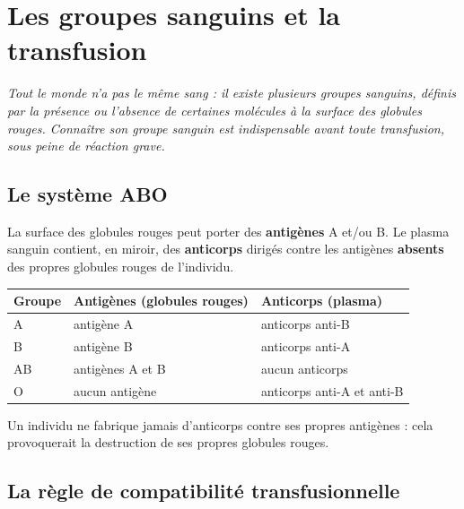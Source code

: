 \chapter{Les groupes sanguins et la transfusion}

\noindent\textit{Tout le monde n'a pas le même sang : il existe plusieurs groupes
sanguins, définis par la présence ou l'absence de certaines molécules à la surface des
globules rouges. Connaître son groupe sanguin est indispensable avant toute transfusion,
sous peine de réaction grave.}
\vspace{8pt}

\connecteBanner

\section{Le système ABO}

\begin{definition}
La surface des globules rouges peut porter des \textbf{antigènes} A et/ou B. Le plasma
sanguin contient, en miroir, des \textbf{anticorps} dirigés contre les antigènes
\textbf{absents} des propres globules rouges de l'individu.
\end{definition}

\begin{propriete}
\begin{center}
\small
\begin{tabular}{lll}
\toprule
\textbf{Groupe} & \textbf{Antigènes (globules rouges)} & \textbf{Anticorps (plasma)} \\
\midrule
A & antigène A & anticorps anti-B \\
B & antigène B & anticorps anti-A \\
AB & antigènes A et B & aucun anticorps \\
O & aucun antigène & anticorps anti-A et anti-B \\
\bottomrule
\end{tabular}
\end{center}
\end{propriete}

\begin{remarque}
Un individu ne fabrique jamais d'anticorps contre ses propres antigènes : cela
provoquerait la destruction de ses propres globules rouges.
\end{remarque}

\section{La règle de compatibilité transfusionnelle}

